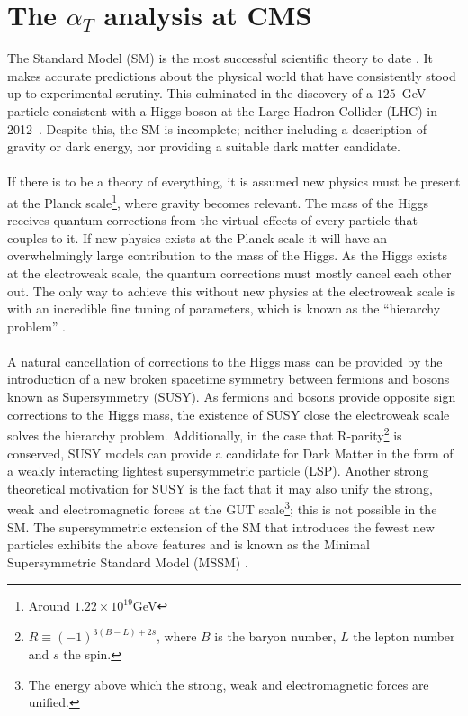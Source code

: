 
\section{The $\alpha_T$ analysis at CMS}
\label{sec:Introduction}

The Standard Model (SM) is the most successful scientific theory to date \cite{Salam1964}\cite{Glashow1961}\cite{Weinberg1967}. It makes accurate predictions about the physical world that have consistently stood up to experimental scrutiny. This culminated in the discovery of a $125$~GeV particle consistent with a Higgs boson at the Large Hadron Collider (LHC) in 2012~\cite{ATLASHiggs2012}\cite{CMS2012HiggsPaper}. Despite this, the SM is incomplete; neither including a description of gravity or dark energy, nor providing a suitable dark matter candidate.
\\\\
If there is to be a theory of everything, it is assumed new physics must be present at the Planck scale\footnote{Around $1.22\times 10^{19}$GeV}, where gravity becomes relevant. The mass of the Higgs receives quantum corrections from the virtual effects of every particle that couples to it. If new physics exists at the Planck scale it will have an overwhelmingly large contribution to the mass of the Higgs. As the Higgs exists at the electroweak scale, the quantum corrections must mostly cancel each other out. The only way to achieve this without new physics at the electroweak scale is with an incredible fine tuning of parameters, which is known as the ``hierarchy problem'' \cite{SUSYprimerMartin:1997ns}. 
\\\\
A natural cancellation of corrections to the Higgs mass can be provided by the introduction of a new broken spacetime symmetry between fermions and bosons known as Supersymmetry (SUSY). As fermions and bosons provide opposite sign corrections to the Higgs mass, the existence of SUSY close the electroweak scale solves the hierarchy problem. Additionally, in the case that R-parity\footnote{$R\equiv (-1)^{3(B-L)+2s}$, where $B$ is the baryon number, $L$ the lepton number and $s$ the spin.} is conserved, SUSY models can provide a candidate for Dark Matter in the form of a weakly interacting lightest supersymmetric particle (LSP). Another strong theoretical motivation for SUSY is the fact that it may also unify the strong, weak and electromagnetic forces at the GUT scale\footnote{The energy above which the strong, weak and electromagnetic forces are unified.}; this is not possible in the SM. The supersymmetric extension of the SM that introduces the fewest new particles exhibits the above features and is known as the Minimal Supersymmetric Standard Model (MSSM) \cite{SUSYprimerMartin:1997ns}.

